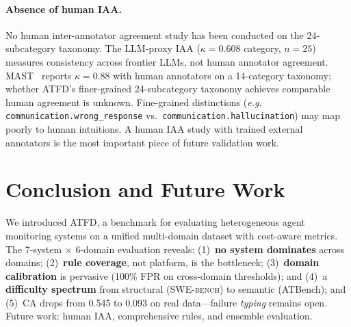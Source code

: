 \documentclass[11pt]{article}
\newcommand{\atfd}{\textsc{ATFD}\xspace}
\newcommand{\swebench}{\textsc{SWE-bench}\xspace}
\newcommand{\eg}{\emph{e.g.}\xspace}
\begin{document}
\paragraph{Absence of human IAA.}
No human inter-annotator agreement study has been conducted on the
24-subcategory taxonomy. The LLM-proxy IAA ($\kappa = 0.608$ category,
$n = 25$) measures consistency across frontier LLMs, not human
annotator agreement. MAST~\citep{cemri2025mast} reports $\kappa = 0.88$
with human annotators on a 14-category taxonomy; whether ATFD's
finer-grained 24-subcategory taxonomy achieves comparable human
agreement is unknown. Fine-grained distinctions (\eg
\texttt{communication.wrong\_response} vs.\
\texttt{communication.hallucination}) may map poorly to human
intuitions. A human IAA study with trained external annotators is
the most important piece of future validation work.

\section{Conclusion and Future Work}
\label{sec:conclusion}

We introduced \atfd, a benchmark for evaluating heterogeneous agent
monitoring systems on a unified multi-domain dataset with cost-aware
metrics. The 7-system $\times$ 6-domain evaluation reveals:
(1)~\textbf{no system dominates} across domains;
(2)~\textbf{rule coverage}, not platform, is the bottleneck;
(3)~\textbf{domain calibration} is pervasive (100\% FPR on cross-domain
thresholds); and
(4)~a \textbf{difficulty spectrum} from structural (\swebench) to
semantic (ATBench); and (5)~CA drops from 0.545 to 0.093 on real
data---failure \emph{typing} remains open. Future work: human IAA,
comprehensive rules, and ensemble evaluation.

\end{document}

